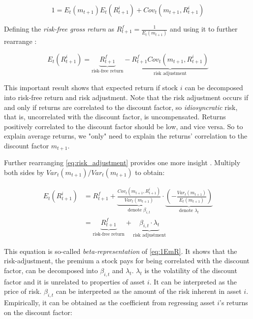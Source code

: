 	 	\begin{equation}
	 		1 = E_t(m_{t+1}) E_t(R_{t+1}^i) + Cov_t(m_{t+1},R_{t+1}^i) 
	 	\end{equation} 
 	
 		Defining the \textit{risk-free gross return} as $R_{t+1}^f=\frac{1}{E_t(m_{t+1})}$ and using it to further rearrange \citep{cochrane2009asset}:
 		
 		\begin{equation}
 			E_t(R_{t+1}^i) = \underbrace{R_{t+1}^f}_\text{risk-free return}  -  \underbrace{R_{t+1}^f Cov_t(m_{t+1},R_{t+1}^i)}_\text{risk adjustment} \label{eq:risk_adjustment}
 		\end{equation} 
 		
 		This important result shows that expected return if stock $i$ can be decomposed into risk-free return and risk adjustment. Note that the risk adjustment occurs if and only if returns are correlated to the discount factor, so \textit{idiosyncratic} risk, that is, uncorrelated with the discount factor, is uncompensated. Returns positively correlated to the discount factor should be low, and vice versa. So to explain average returns, we "only" need to explain the returns' correlation to the discount factor $m_{t+1}$. 
 		
 		Further rearranging \ref{eq:risk_adjustment} provides one more insight \citep{cochrane2009asset}. Multiply both sides by $Var_t(m_{t+1})/Var_t(m_{t+1})$ to obtain:
 		
 		\begin{align}
	 		E_t(R_{t+1}^i) 
	 		& = {R_{t+1}^f} + 
	 		\underbrace{
	 			\frac{Cov_t(m_{t+1},R_{t+1}^i)}{Var_t(m_{t+1})}
	 			}_\text{denote $\beta_{i,t}$} 
 			\cdot 
 			\underbrace{
 				\left(-\frac{Var_t(m_{t+1})}{E_t(m_{t+1})}\right)
 				}_\text{denote $\lambda_{t}$} \label{eq:factor_model} \\
 			& = \underbrace{{R_{t+1}^f}
 				}_\text{risk-free return} 
 				+ 
 				\underbrace{\beta_{i,t} \cdot \lambda_{t}
 				}_\text{risk adjustment} \label{eq:beta_reprezentation}
 		\end{align} 
 		
 		This equation is so-called \textit{beta-representation} of \ref{eq:1EmR}. It shows that the risk-adjustment, the premium a stock pays for being correlated with the discount factor, can be decomposed into $\beta_{i,t}$ and $\lambda_t$. $\lambda_t$ is the volatility of the discount factor and it is unrelated to properties of asset $i$. It can be interpreted as the price of risk. $\beta_{i,t}$ can be interpreted as the amount of the risk inherent in asset $i$. Empirically, it can be obtained as the coefficient from regressing asset $i$'s returns on the discount factor: 
 		
